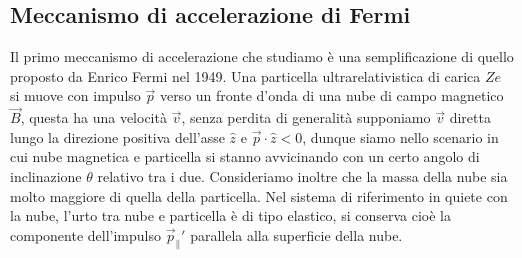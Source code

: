 \subsection{Meccanismo di accelerazione di Fermi}
Il primo meccanismo di accelerazione che studiamo è una semplificazione di quello proposto da Enrico Fermi nel 1949. Una particella ultrarelativistica di carica $Ze$ si muove con impulso $\vec{p}$ verso un fronte d'onda di una nube di campo magnetico $\vec{B}$, questa ha una velocità $\vec{v}$, senza perdita di generalità supponiamo $\vec{v}$ diretta lungo la direzione positiva dell'asse $\hat{z}$ e $\vec{p}\cdot\hat{z} < 0$, dunque siamo nello scenario in cui nube magnetica e particella si stanno avvicinando con un certo angolo di inclinazione $\theta$ relativo tra i due. Consideriamo inoltre che la massa della nube sia molto maggiore di quella della particella. Nel sistema di riferimento in quiete con la nube, l'urto tra nube e particella è di tipo elastico, si conserva cioè la componente dell'impulso $\vec{p}_\parallel '$ parallela alla superficie della nube. 

